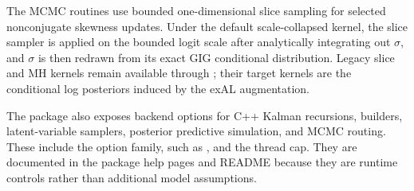 \documentclass{jss}
\begin{document}
\label{sec:slice}

The MCMC routines use bounded one-dimensional slice sampling for selected
nonconjugate skewness updates. Under the default scale-collapsed kernel, the
slice sampler is applied on the bounded logit scale after analytically
integrating out \(\sigma\), and \(\sigma\) is then redrawn from its exact GIG
conditional distribution. Legacy slice and MH kernels remain available through
; their target kernels are the conditional log posteriors
induced by the exAL augmentation.

\label{sec:app_backend_options}
The package also exposes backend options for C++ Kalman recursions, builders,
latent-variable samplers, posterior predictive simulation, and MCMC routing.
These include the  option family, such as
, and the  thread cap.
They are documented in the package help pages and README because they are
runtime controls rather than additional model assumptions.


\end{document}
